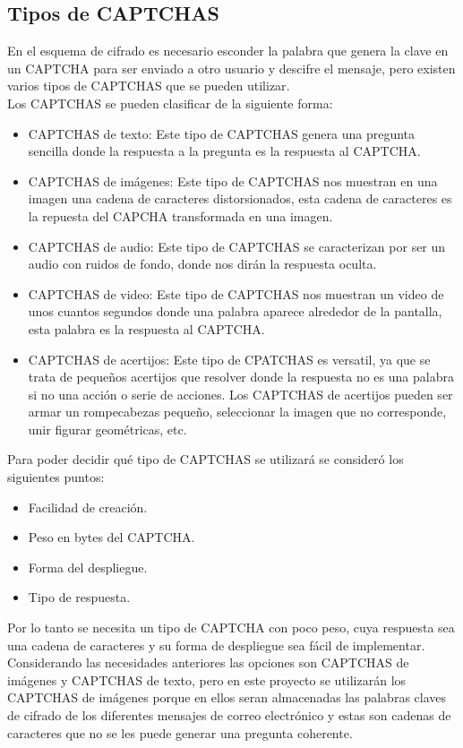 \subsection{Tipos de CAPTCHAS}
En el esquema de cifrado es necesario esconder la palabra que genera la clave en un CAPTCHA para ser enviado a otro usuario y descifre el mensaje, pero existen varios tipos de CAPTCHAS que se pueden utilizar\cite{cit}.\\Los CAPTCHAS se pueden clasificar de la siguiente forma:
\begin{itemize}
 \item CAPTCHAS de texto: Este tipo de CAPTCHAS genera una pregunta sencilla donde la respuesta a la pregunta es la respuesta al CAPTCHA.
 \item CAPTCHAS de imágenes: Este tipo de CAPTCHAS nos muestran en una imagen una cadena de caracteres distorsionados, esta cadena de caracteres es la repuesta del CAPCHA transformada en una imagen.
 \item CAPTCHAS de audio: Este tipo de CAPTCHAS se caracterizan por  ser un audio con ruidos de fondo, donde nos dirán la respuesta oculta.
 \item CAPTCHAS de video: Este tipo de CAPTCHAS nos muestran un video de unos cuantos segundos donde una palabra aparece alrededor de la pantalla, esta palabra es la respuesta al CAPTCHA.
 \item CAPTCHAS de acertijos: Este tipo de CPATCHAS es versatil, ya que se trata de pequeños acertijos que resolver donde la respuesta no es una palabra si no una acción o serie de acciones. Los CAPTCHAS de acertijos pueden ser armar un rompecabezas pequeño, seleccionar la imagen que no corresponde, unir figurar geométricas, etc. 
\end{itemize}
Para poder decidir qué tipo de CAPTCHAS se utilizará se consideró los siguientes puntos:
\begin{itemize}
 \item Facilidad de creación.
 \item Peso en bytes del CAPTCHA.
 \item Forma del despliegue.
 \item Tipo de respuesta.
\end{itemize}
Por lo tanto se necesita un tipo de CAPTCHA con poco peso, cuya respuesta sea una cadena de caracteres y su forma de despliegue sea fácil de implementar. \\
Considerando las necesidades anteriores las opciones son CAPTCHAS de imágenes y CAPTCHAS de texto, pero en este proyecto se utilizarán los CAPTCHAS de imágenes porque en ellos seran almacenadas las palabras claves de cifrado de los diferentes mensajes de correo electrónico y estas son cadenas de caracteres que no se les puede generar una pregunta coherente. \\
